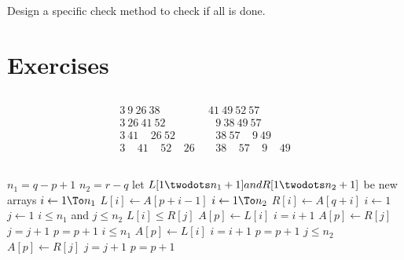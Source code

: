 \documentclass[paper=a4, fontsize=11pt,oneside]{book} %
\numberwithin{equation}{section} %
\numberwithin{figure}{section} %
\numberwithin{table}{section} %
\begin{document}
		\subsection{}
			Design a specific check method to check if all is done. 
			
	\section{Exercises}
		\subsection{}
		\begin{align*}
			3 \ 9 \ 26  \ 38\  &41 \  49 \  52 \  57\\
			3 \ 26\  41\  52 \ \ &\ \ \ 9\  38\  49\  57\\
			3 \ 41 \ \ \ \ \ 26\  52 \ \ &\ \ \ 38\  57 \ \ \ \ \ 9\  49\\
			3 \ \ \ \ \ 41 \ \ \ \ \ 52 \ \ \ \ \ 26 \ \ &\ \ \ 38 \ \ \ \ \ 57 \ \ \ \ \ 9 \ \ \ \ \ 49
		\end{align*}
		
		\subsection{}
					\begin{codebox}
						\li $n_1 = q -p + 1$
						\li $n_2 = r - q$
						\li let $L[1 \twodots n_1 + 1] and R[1 \twodots n_2 + 1]$ be new arrays
						\li \For $i \gets 1 \To n_1 $
						\li \Do
							$L[i] \gets A[p + i - 1]$
						\End
						\li \For $i \gets 1 \To n_2$
						\li \Do
							$R[i] \gets A[q + i]$
							\End
						\li $i \gets 1$
						\li $j \gets 1$
						\li \While $i \leq n_1$ and $ j \leq n_2$
						\li \Do
							\If $L[i] \leq R[j]$
							\li \Then
								$A[p] \gets L[i]$
							\li	$i = i + 1$
						\li	\Else
						\li
								$A[p] \gets R[j]$
							\li $j = j + 1$
							\End
					\li		$p = p + 1$
					\End
					\li \While $i \leq n_1$
					\li \Do
						$A[p] \gets L[i]$
					\li $i = i + 1 $
					\li $p = p + 1$
					   \End
					\li \While $j \leq n_2$
					\li \Do
						$A[p] \gets R[j]$
					\li $j = j + 1 $
					\li $p = p + 1$
					\End						
						
						\End
					\end{codebox}
\end{document}
